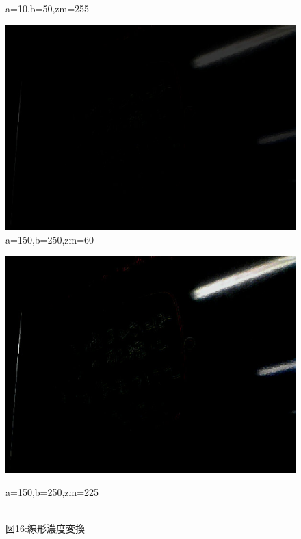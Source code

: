 ﻿\documentclass[a4j,11pt]{jarticle}
\begin{document}
\begin{figure}[tb]
\begin{minipage}{0.49\hsize}
   \\a=10,b=50,zm=255
 \end{minipage}
 \begin{minipage}{0.49\hsize} %
   \center
   \includegraphics[width=\hsize]{./eps/contrast-linear-highlow.eps}
   \\a=150,b=250,zm=60
 \end{minipage}
 \begin{minipage}{0.49\hsize} %
   \center
   \includegraphics[width=\hsize]{./eps/contrast-linear-highhigh.eps}

   a=150,b=250,zm=225
 \end{minipage}
 \\
 図16:線形濃度変換
 \label{fig:affine2}
\end{figure}
\end{document}
